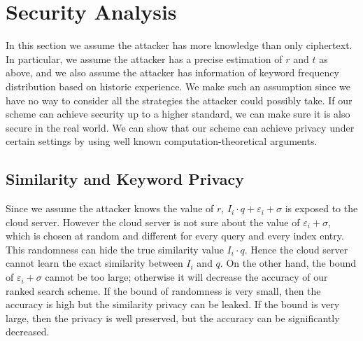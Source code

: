 \documentclass{IEEEtran}
\begin{document}
\section{Security Analysis}
In this section we assume the attacker has more knowledge than only ciphertext. In particular, we assume the attacker has a precise estimation of $r$ and $t$ as above, and we also assume the attacker has information of keyword frequency distribution based on historic experience. We make such an assumption since we have no way to consider all the strategies the attacker could possibly take. If our scheme can achieve security up to a higher standard, we can make sure it is also secure in the real world. We can show that our scheme can achieve privacy under certain settings by using well known computation-theoretical arguments.

\subsection{Similarity and Keyword Privacy}
Since we assume the attacker knows the value of $r$, $I_i\cdot q+\varepsilon_i+\sigma$ is exposed to the cloud server. However the cloud server is not sure about the value of $\varepsilon_i+\sigma$, which is chosen at random and different for every query and every index entry. This randomness can hide the true similarity value $I_i\cdot q$. Hence the cloud server cannot learn the exact similarity between $I_i$ and $q$. On the other hand, the bound of $\varepsilon_i+\sigma$ cannot be too large; otherwise it will decrease the accuracy of our ranked search scheme. If the bound of randomness is very small, then the accuracy is high but the similarity privacy can be leaked. If the bound is very large, then the privacy is well preserved, but the accuracy can be significantly decreased.
\end{document}
